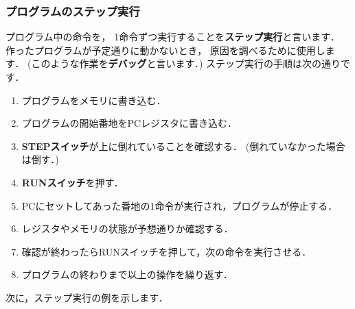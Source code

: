\subsubsection{プログラムのステップ実行}
\label{step}
プログラム中の命令を，
1命令ずつ実行することを{\bf ステップ実行}と言います．
作ったプログラムが予定通りに動かないとき，
原因を調べるために使用します．
(このような作業を{\bf デバッグ}と言います．)
ステップ実行の手順は次の通りです．
\begin{enumerate}
\item プログラムをメモリに書き込む．
\item プログラムの開始番地をPCレジスタに書き込む．
\item {\bf STEPスイッチ}が上に倒れていることを確認する．
(倒れていなかった場合は倒す．)
\item {\bf RUNスイッチ}を押す．
\item PCにセットしてあった番地の1命令が実行され，プログラムが停止する．
\item レジスタやメモリの状態が予想通りか確認する．
\item 確認が終わったらRUNスイッチを押して，次の命令を実行させる．
\item プログラムの終わりまで以上の操作を繰り返す．
\end{enumerate}

次に，ステップ実行の例を示します．

\begin{center}
\end{center}

